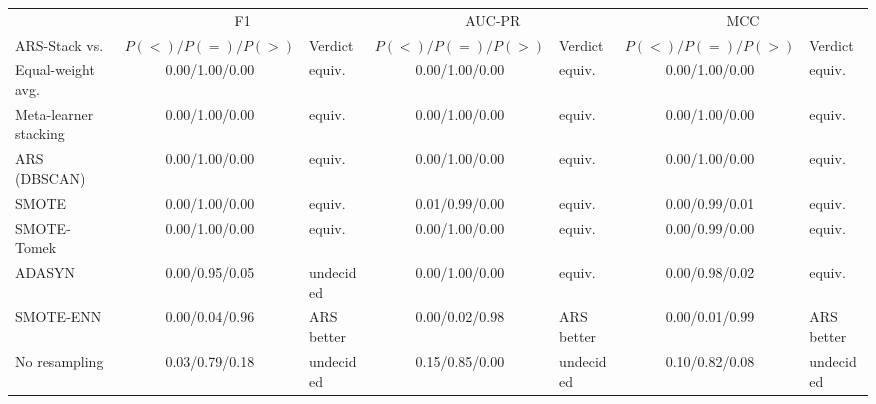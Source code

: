 \begin{tabular}{lclclcl}
\toprule
 & \multicolumn{2}{c}{F1} & \multicolumn{2}{c}{AUC-PR} & \multicolumn{2}{c}{MCC} \\
\cmidrule(lr){2-3}\cmidrule(lr){4-5}\cmidrule(lr){6-7}
ARS-Stack vs. & $P(<)/P(=)/P(>)$ & Verdict & $P(<)/P(=)/P(>)$ & Verdict & $P(<)/P(=)/P(>)$ & Verdict \\
\midrule
Equal-weight avg. & 0.00/1.00/0.00 & equiv. & 0.00/1.00/0.00 & equiv. & 0.00/1.00/0.00 & equiv. \\
Meta-learner stacking & 0.00/1.00/0.00 & equiv. & 0.00/1.00/0.00 & equiv. & 0.00/1.00/0.00 & equiv. \\
ARS (DBSCAN) & 0.00/1.00/0.00 & equiv. & 0.00/1.00/0.00 & equiv. & 0.00/1.00/0.00 & equiv. \\
SMOTE & 0.00/1.00/0.00 & equiv. & 0.01/0.99/0.00 & equiv. & 0.00/0.99/0.01 & equiv. \\
SMOTE-Tomek & 0.00/1.00/0.00 & equiv. & 0.00/1.00/0.00 & equiv. & 0.00/0.99/0.00 & equiv. \\
ADASYN & 0.00/0.95/0.05 & undecided & 0.00/1.00/0.00 & equiv. & 0.00/0.98/0.02 & equiv. \\
SMOTE-ENN & 0.00/0.04/0.96 & ARS better & 0.00/0.02/0.98 & ARS better & 0.00/0.01/0.99 & ARS better \\
No resampling & 0.03/0.79/0.18 & undecided & 0.15/0.85/0.00 & undecided & 0.10/0.82/0.08 & undecided \\
\bottomrule
\end{tabular}
